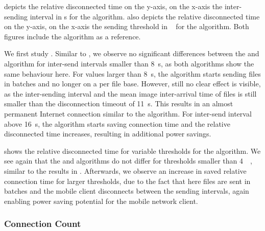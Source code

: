  depicts the relative disconnected time \relativeDisconnectedTime on the y-axis, on the x-axis the inter-sending interval in \si{\second} for the \algointerval algorithm. 
 also depicts the relative disconnected time \relativeDisconnectedTime on the y-axis, on the x-axis the sending threshold in \si{\mega\byte} for the \algosize algorithm. 
Both figures include the \algoimmediate algorithm as a reference.

We first study .
Similar to , we observe no significant differences between the \algointerval and \algoimmediate algorithm for inter-send intervals smaller than \SI{8}{\second}, as both algorithms show the same behaviour here.
For values larger than \SI{8}{\second}, the \algointerval algorithm starts sending files in batches and no longer on a per file base.
However, still no clear effect is visible, as the inter-sending interval and the mean image inter-arrival time of files is still smaller than the disconnection timeout of \SI{11}{\second}.
This results in an almost permanent Internet connection similar to the \algoimmediate algorithm.
For inter-send interval above \SI{16}{\second}, the \algointerval algorithm starts saving connection time and the relative disconnected time \relativeDisconnectedTime increases, resulting in additional power savings.

 shows the relative disconnected time \relativeDisconnectedTime for variable thresholds for the \algosize algorithm.
We see again that the \algosize and \algoimmediate algorithms do not differ for thresholds smaller than \SI{4}{\mega\byte}, similar to the results in .
Afterwards, we observe an increase in saved relative connection time \relativeDisconnectedTime for larger thresholds, due to the fact that here files are sent in batches and the mobile client disconnects between the sending intervals, again enabling power saving potential for the mobile network client.

\subsubsection*{Connection Count}\label{sec:application:cloud_file_synchronisation:numerical_evaluation:connection_count}

